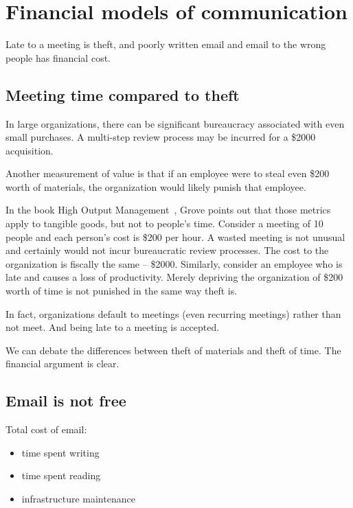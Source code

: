 \section{Financial models of communication}

Late to a meeting is theft, and poorly written email and email to the wrong people has financial cost.

\subsection*{Meeting time compared to theft}

In large organizations, there can be significant bureaucracy associated with even small purchases. A multi-step review process may be incurred for a \$2000 acquisition.

Another measurement of value is that if an employee were to steal even \$200 worth of materials, the organization would likely punish that employee.


In the book High Output Management~\cite{1995_Grove}, Grove points out that those metrics apply to tangible goods, but not to people's time. Consider a meeting of 10 people and each person's cost is \$200 per hour. 
A wasted meeting is not unusual and certainly would not incur bureaucratic review processes. The cost to the organization is fiscally the same -- \$2000. Similarly, consider an employee who is late and causes a loss of productivity. Merely depriving the organization of \$200 worth of time is not punished in the same way theft is.

In fact, organizations default to meetings (even recurring meetings) rather than not meet. And being late to a meeting is accepted. 

We can debate the differences between theft of materials and theft of time. The financial argument is clear. 


\subsection*{Email is not free}

Total cost of email:
\begin{itemize}
    \item time spent writing
    \item time spent reading
    \item infrastructure maintenance
\end{itemize}

